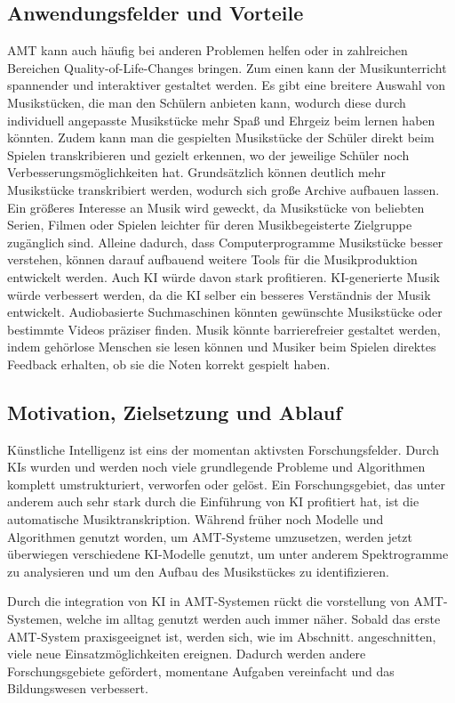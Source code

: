 \subsection{Anwendungsfelder und Vorteile}\label{subsec:praktisch}
AMT kann auch häufig bei anderen Problemen helfen
oder in zahlreichen Bereichen Quality-of-Life-Changes bringen.
Zum einen kann der Musikunterricht spannender und interaktiver gestaltet werden.
Es gibt eine breitere Auswahl von Musikstücken, die man den Schülern anbieten kann,
wodurch diese durch individuell angepasste Musikstücke mehr Spaß und Ehrgeiz beim lernen haben könnten.
Zudem kann man die gespielten Musikstücke der Schüler direkt beim Spielen transkribieren und gezielt erkennen,
wo der jeweilige Schüler noch Verbesserungsmöglichkeiten hat.
Grundsätzlich können deutlich mehr Musikstücke transkribiert werden,
wodurch sich große Archive aufbauen lassen.
Ein größeres Interesse an Musik wird geweckt, da Musikstücke von beliebten Serien, Filmen oder Spielen
leichter für deren Musikbegeisterte Zielgruppe zugänglich sind.
Alleine dadurch, dass Computerprogramme Musikstücke besser verstehen,
können darauf aufbauend weitere Tools für die Musikproduktion entwickelt werden.
Auch KI würde davon stark profitieren.
KI-generierte Musik würde verbessert werden, da die KI selber ein besseres Verständnis der Musik entwickelt.
Audiobasierte Suchmaschinen könnten gewünschte Musikstücke oder bestimmte Videos präziser finden.
Musik könnte barrierefreier gestaltet werden,
indem gehörlose Menschen sie lesen können und Musiker beim Spielen direktes Feedback erhalten,
ob sie die Noten korrekt gespielt haben.

\subsection{Motivation, Zielsetzung und Ablauf}
Künstliche Intelligenz ist eins der momentan aktivsten Forschungsfelder.
Durch KIs wurden und werden noch viele grundlegende Probleme
und Algorithmen komplett umstrukturiert, verworfen oder gelöst.
Ein Forschungsgebiet, das unter anderem auch sehr stark durch die Einführung von KI profitiert hat,
ist die automatische Musiktranskription.
Während früher noch Modelle und Algorithmen genutzt worden, um AMT-Systeme umzusetzen,
werden jetzt überwiegen verschiedene KI-Modelle genutzt,
um unter anderem Spektrogramme zu analysieren und um den Aufbau des Musikstückes zu identifizieren.

Durch die integration von KI in AMT-Systemen rückt die vorstellung von AMT-Systemen,
welche im alltag genutzt werden auch immer näher.
Sobald das erste AMT-System praxisgeeignet ist, werden sich, wie im Abschnitt. angeschnitten,
viele neue Einsatzmöglichkeiten ereignen.
Dadurch werden andere Forschungsgebiete gefördert, momentane Aufgaben vereinfacht und das Bildungswesen verbessert.

